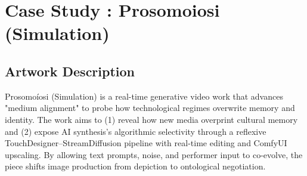 \documentclass[sigconf,nonacm]{acmart}
\begin{document}
\section{Case Study : Prosomoiosi (Simulation)}

\subsection{Artwork Description}


Prosomoíosi (Simulation) is a real-time generative video work that advances "medium alignment" to probe how technological regimes overwrite memory and identity. The work aims to (1) reveal how new media overprint cultural memory and (2) expose AI synthesis's algorithmic selectivity through a reflexive TouchDesigner–StreamDiffusion pipeline with real-time editing and ComfyUI upscaling. By allowing text prompts, noise, and performer input to co-evolve, the piece shifts image production from depiction to ontological negotiation.
\end{document}

